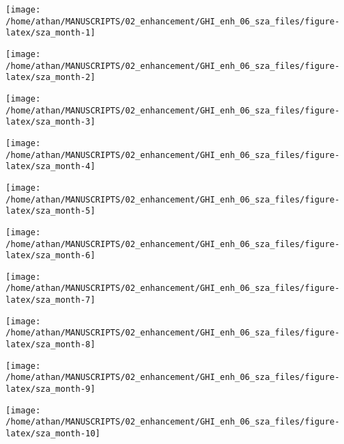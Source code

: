 \documentclass[
  10pt,
  a4paper,oneside]{article}
\begin{document}
\begin{center}\texttt{[image: /home/athan/MANUSCRIPTS/02\_enhancement/GHI\_enh\_06\_sza\_files/figure-latex/sza\_month-1]} \end{center}

\begin{center}\texttt{[image: /home/athan/MANUSCRIPTS/02\_enhancement/GHI\_enh\_06\_sza\_files/figure-latex/sza\_month-2]} \end{center}

\begin{center}\texttt{[image: /home/athan/MANUSCRIPTS/02\_enhancement/GHI\_enh\_06\_sza\_files/figure-latex/sza\_month-3]} \end{center}

\begin{center}\texttt{[image: /home/athan/MANUSCRIPTS/02\_enhancement/GHI\_enh\_06\_sza\_files/figure-latex/sza\_month-4]} \end{center}

\begin{center}\texttt{[image: /home/athan/MANUSCRIPTS/02\_enhancement/GHI\_enh\_06\_sza\_files/figure-latex/sza\_month-5]} \end{center}

\begin{center}\texttt{[image: /home/athan/MANUSCRIPTS/02\_enhancement/GHI\_enh\_06\_sza\_files/figure-latex/sza\_month-6]} \end{center}

\begin{center}\texttt{[image: /home/athan/MANUSCRIPTS/02\_enhancement/GHI\_enh\_06\_sza\_files/figure-latex/sza\_month-7]} \end{center}

\begin{center}\texttt{[image: /home/athan/MANUSCRIPTS/02\_enhancement/GHI\_enh\_06\_sza\_files/figure-latex/sza\_month-8]} \end{center}

\begin{center}\texttt{[image: /home/athan/MANUSCRIPTS/02\_enhancement/GHI\_enh\_06\_sza\_files/figure-latex/sza\_month-9]} \end{center}

\begin{center}\texttt{[image: /home/athan/MANUSCRIPTS/02\_enhancement/GHI\_enh\_06\_sza\_files/figure-latex/sza\_month-10]} \end{center}
\end{document}
